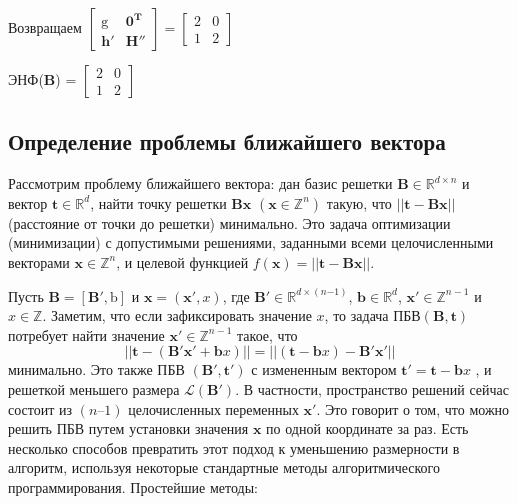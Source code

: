 \begin{enumerate}
Возвращаем $ \left[\begin{array}{cccc}
\mathrm{g} & \mathbf{0}^\mathbf{T} \\
\mathbf{h}' & \mathbf{H}''
\end{array}\right] = \left[\begin{array}{cccc}
2 & 0 \\
1 & 2
\end{array}\right] $
\end{enumerate}

ЭНФ($ \mathbf{B} $) = $ \left[\begin{array}{cccc}
2 & 0 \\
1 & 2
\end{array}\right] $

\subsection{Определение проблемы ближайшего вектора}

Рассмотрим проблему ближайшего вектора: дан базис решетки $ \mathbf{B} \in \mathbb{R}^{d \times n} $ и вектор $ \mathbf{t} \in \mathbb{R}^d $, найти точку решетки $ \mathbf{Bx} $ $ (\mathbf{x} \in \mathbb{Z}^n) $ такую, что $ ||\mathbf{t - Bx}|| $ (расстояние от точки до решетки) минимально. Это задача оптимизации (минимизации) с допустимыми решениями, заданными всеми целочисленными векторами $ \mathbf{x} \in \mathbb{Z}^n $, и целевой функцией $ f(\mathbf{x}) = ||\mathbf{t - Bx}|| $.

Пусть $ \mathbf{B} = [\mathbf{B}', \mathrm{b}] $ и $ \mathbf{x} = (\mathbf{x}', x) $, где $ \mathbf{B}' \in \mathbb{R}^{d \times \left( n \mathrm{-} 1 \right)} $, $ \mathbf{b} \in \mathbb{R}^d $, $ \mathbf{x}' \in \mathbb{Z}^{n-1} $ и $ x \in \mathbb{Z} $.
Заметим, что если зафиксировать значение $ x $, то задача $ \text{ПБВ}(\mathbf{B, t}) $ потребует найти значение $ \mathbf{x}' \in \mathbb{Z}^{n - 1} $ такое, что 
$$ ||\mathbf{t} - (\mathbf{B}'\mathbf{x}' + \mathbf{b}x)|| = ||(\mathbf{t} - \mathbf{b}x)-\mathbf{B}'\mathbf{x}'|| $$ 
минимально. Это также ПБВ $ (\mathbf{B}', \mathbf{t}') $ с измененным вектором $ \mathbf{t}' = \mathbf{t} - \mathbf{b}x$ , и решеткой меньшего размера $ \mathcal{L}(\mathbf{B}') $. В частности, пространство решений сейчас состоит из $ (n – 1) $ целочисленных переменных $ \mathbf{x}' $. Это говорит о том, что можно решить ПБВ путем установки значения $ \mathbf{x} $ по одной координате за раз.
Есть несколько способов превратить этот подход к уменьшению размерности в алгоритм, используя некоторые стандартные методы алгоритмического программирования. Простейшие методы:

